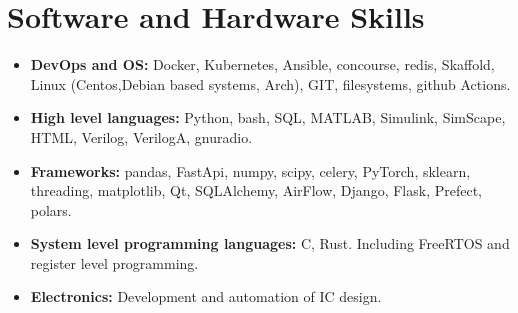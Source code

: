\documentclass{article}
\begin{document}

\section{Software and Hardware Skills}

\begin{itemize}
   \item \textbf{DevOps and OS:} Docker, Kubernetes, Ansible, concourse, redis, Skaffold, Linux (Centos,Debian based systems, Arch), GIT, filesystems, github Actions.
   \item \textbf{High level languages:} Python, bash, SQL, MATLAB, Simulink, SimScape, HTML, Verilog, VerilogA, gnuradio.
   \item \textbf{Frameworks:} pandas, FastApi, numpy, scipy, celery, PyTorch, sklearn, threading, matplotlib, Qt, SQLAlchemy, AirFlow, Django, Flask, Prefect, polars.
   \item \textbf{System level programming languages:} C, Rust. Including FreeRTOS and register level programming.
   \item \textbf{Electronics:} Development and automation of IC design.
\end{itemize}
\end{document}
